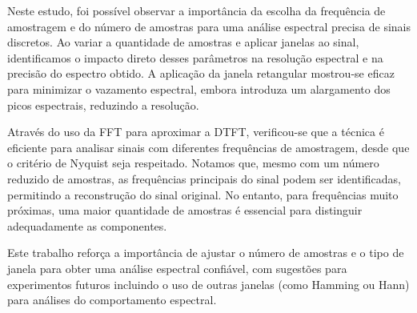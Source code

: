 Neste estudo, foi possível observar a importância da escolha da frequência de amostragem e do número de amostras para uma análise espectral precisa de sinais discretos. Ao variar a quantidade de amostras e aplicar janelas ao sinal, identificamos o impacto direto desses parâmetros na resolução espectral e na precisão do espectro obtido. A aplicação da janela retangular mostrou-se eficaz para minimizar o vazamento espectral, embora introduza um alargamento dos picos espectrais, reduzindo a resolução.

Através do uso da FFT para aproximar a DTFT, verificou-se que a técnica é eficiente para analisar sinais com diferentes frequências de amostragem, desde que o critério de Nyquist seja respeitado. Notamos que, mesmo com um número reduzido de amostras, as frequências principais do sinal podem ser identificadas, permitindo a reconstrução do sinal original. No entanto, para frequências muito próximas, uma maior quantidade de amostras é essencial para distinguir adequadamente as componentes.

Este trabalho reforça a importância de ajustar o número de amostras e o tipo de janela para obter uma análise espectral confiável, com sugestões para experimentos futuros incluindo o uso de outras janelas (como Hamming ou Hann) para análises do comportamento espectral.
